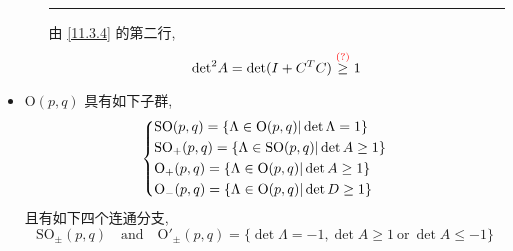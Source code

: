 \begin{itemize}
\begin{itemize}
\begin{tcolorbox}[title=proof:]
			\noindent\rule[0.5ex]{\linewidth}{0.5pt} %
			
			由 \eqref{11.3.4} 的第二行,
			\begin{equation}
				{\det}^2 A = \det(I + C^T C) \overset{\textcolor{red}{(?)}}{\geq} 1
			\end{equation}
		\end{tcolorbox}
	\end{itemize}
	
	\item $\mathrm{O}(p, q)$ 具有如下子群,
	\begin{equation}
		\begin{dcases}
			\mathrm{SO}(p, q) = \{\Lambda \in \mathrm{O}(p, q) | \det \Lambda = 1\} \\
			\mathrm{SO}_+(p, q) = \{\Lambda \in \mathrm{SO}(p, q) | \det A \geq 1\} \\
			\mathrm{O}_+(p, q) = \{\Lambda \in \mathrm{O}(p, q) | \det A \geq 1\} \\
			\mathrm{O}_-(p, q) = \{\Lambda \in \mathrm{O}(p, q) | \det D \geq 1\}
		\end{dcases}
	\end{equation}
	且有如下四个连通分支,
	\begin{equation}
		\mathrm{SO}_\pm(p, q) \quad \text{and} \quad \mathrm{O'}_\pm(p, q) = \{\det \Lambda = - 1, \det A \geq 1 \ \text{or} \ \det A \leq - 1\}
	\end{equation}
\end{itemize}

